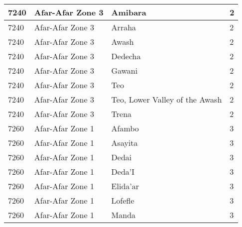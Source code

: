 \documentclass[12pt,a4paper,openbib,titlepage]{report}
\begin{document}
\begin{longtable}{|p{2cm}|p{6.5cm}|p{8cm}|p{1.5cm}|}
\hline 
\rule[-1ex]{0pt}{2.5ex} 7240 & Afar-Afar Zone 3 & Amibara & 2 \\
\hline 
\rule[-1ex]{0pt}{2.5ex} 7240 & Afar-Afar Zone 3 & Arraha & 2 \\
\hline 
\rule[-1ex]{0pt}{2.5ex} 7240 & Afar-Afar Zone 3 & Awash & 2 \\
\hline 
\rule[-1ex]{0pt}{2.5ex} 7240 & Afar-Afar Zone 3 & Dedecha & 2 \\
\hline 
\rule[-1ex]{0pt}{2.5ex} 7240 & Afar-Afar Zone 3 & Gawani & 2 \\
\hline 
\rule[-1ex]{0pt}{2.5ex} 7240 & Afar-Afar Zone 3 & Teo & 2 \\
\hline 
\rule[-1ex]{0pt}{2.5ex} 7240 & Afar-Afar Zone 3 & Teo, Lower Valley of the Awash & 2 \\
\hline 
\rule[-1ex]{0pt}{2.5ex} 7240 & Afar-Afar Zone 3 & Trena & 2 \\
\hline 
\rule[-1ex]{0pt}{2.5ex} 7260 & Afar-Afar Zone 1 & Afambo & 3 \\
\hline 
\rule[-1ex]{0pt}{2.5ex} 7260 & Afar-Afar Zone 1 & Asayita & 3 \\
\hline 
\rule[-1ex]{0pt}{2.5ex} 7260 & Afar-Afar Zone 1 & Dedai & 3 \\
\hline 
\rule[-1ex]{0pt}{2.5ex} 7260 & Afar-Afar Zone 1 & Deda'I & 3 \\
\hline 
\rule[-1ex]{0pt}{2.5ex} 7260 & Afar-Afar Zone 1 & Elida'ar & 3 \\
\hline 
\rule[-1ex]{0pt}{2.5ex} 7260 & Afar-Afar Zone 1 & Lofefle & 3 \\
\hline 
\rule[-1ex]{0pt}{2.5ex} 7260 & Afar-Afar Zone 1 & Manda & 3 \\
\hline 
\end{longtable} 
\end{document}
